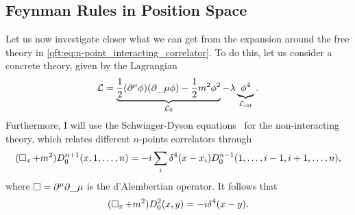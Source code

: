 \documentclass[../main.tex]{subfiles}
\begin{document}
\subsection{Feynman Rules in Position Space}
\label{qft:subsec:position_feynman_rules}
Let us now investigate closer what we can get from the expansion around the free theory in \cref{qft:eq:n-point_interacting_correlator}.
To do this, let us consider a concrete theory, given by the Lagrangian
\begin{equation}
  \label{qft:eq:phi4}
  \L = \underbrace{\frac{1}{2}(\partial\^\mu \phi)(\partial\_\mu\phi) - \frac{1}{2}m^2 \phi^2}_{\L_0} - \lambda \underbrace{\phi^4}_{\L_\text{int}}.
\end{equation}
Furthermore, I will use the Schwinger-Dyson equations~\cite{Schwartz:2014sze} for the non-interacting theory, which relates different \(n\)-points correlators through
\begin{equation}
  \label{qft:eq:Schwinger-Dyson_n-point}
  (\operatorname{\Box}_x + m^2) D_0^{n+1}(x, 1, \ldots, n) = -i\sum_{i} \delta^4(x-x_i) D_0^{n-1}(1, \ldots, i-1, i+1, \ldots, n),
\end{equation}
where \(\dA = \partial\^\mu \partial\_\mu\) is the d'Alembertian operator.
It follows that
\begin{equation}
  \label{qft:eq:Schwinger-Dyson_2-point}
  (\operatorname{\Box}_x + m^2) D^2_0(x,y) = -i \delta^4(x-y).
\end{equation}
\end{document}
